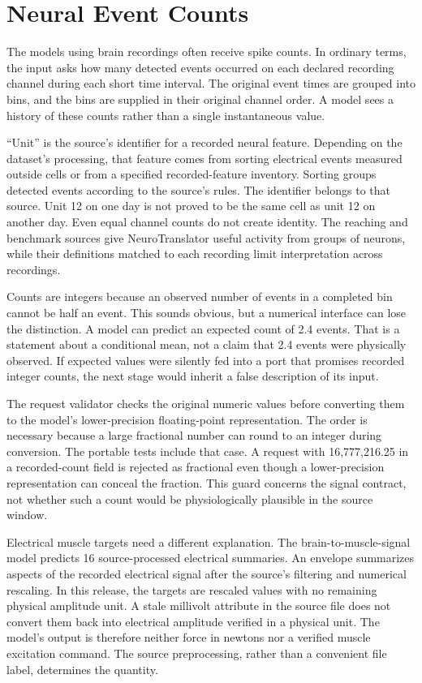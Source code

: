 \section{Neural Event Counts}

The models using brain recordings often receive spike counts. In ordinary terms, the input asks how many detected events occurred on each declared recording channel during each short time interval. The original event times are grouped into bins, and the bins are supplied in their original channel order. A model sees a history of these counts rather than a single instantaneous value.

``Unit'' is the source's identifier for a recorded neural feature. Depending on the dataset's processing, that feature comes from sorting electrical events measured outside cells or from a specified recorded-feature inventory. Sorting groups detected events according to the source's rules. The identifier belongs to that source. Unit 12 on one day is not proved to be the same cell as unit 12 on another day. Even equal channel counts do not create identity. The reaching and benchmark sources give NeuroTranslator useful activity from groups of neurons, while their definitions matched to each recording limit interpretation across recordings.\cite{odoherty2020,nlb2021,falcon2024}

Counts are integers because an observed number of events in a completed bin cannot be half an event. This sounds obvious, but a numerical interface can lose the distinction. A model can predict an expected count of 2.4 events. That is a statement about a conditional mean, not a claim that 2.4 events were physically observed. If expected values were silently fed into a port that promises recorded integer counts, the next stage would inherit a false description of its input.

The request validator checks the original numeric values before converting them to the model's lower-precision floating-point representation. The order is necessary because a large fractional number can round to an integer during conversion. The portable tests include that case. A request with 16,777,216.25 in a recorded-count field is rejected as fractional even though a lower-precision representation can conceal the fraction. This guard concerns the signal contract, not whether such a count would be physiologically plausible in the source window.

Electrical muscle targets need a different explanation. The brain-to-muscle-signal model predicts 16 source-processed electrical summaries. An envelope summarizes aspects of the recorded electrical signal after the source's filtering and numerical rescaling. In this release, the targets are rescaled values with no remaining physical amplitude unit. A stale millivolt attribute in the source file does not convert them back into electrical amplitude verified in a physical unit. The model's output is therefore neither force in newtons nor a verified muscle excitation command. The source preprocessing, rather than a convenient file label, determines the quantity.\cite{falcon2024}


